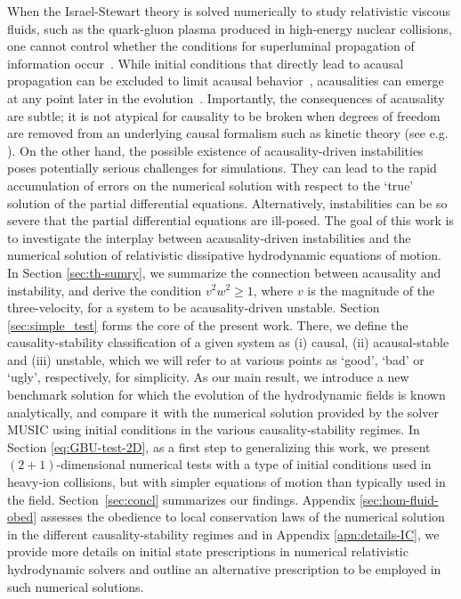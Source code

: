 \documentclass[aps, prd, showkeys,superscriptaddress, nofootinbib,floatfix]{revtex4-2}
\begin{document}
When the Israel-Stewart theory is solved numerically to study relativistic viscous fluids, such as the quark-gluon plasma produced in high-energy nuclear collisions, one cannot control whether the conditions for superluminal propagation of information occur~\cite{Plumberg:2021bme,Chiu:2021muk,ExTrEMe:2023nhy,Domingues:2024pom}. While initial conditions that directly lead to acausal propagation can be excluded to limit acausal behavior~\cite{Domingues:2024pom}, acausalities can emerge at any point later in the evolution~\cite{Hoshino:2024qun}. Importantly, the consequences of acausality are subtle; it is not atypical for causality to be broken when degrees of freedom are removed from an underlying causal formalism such as kinetic theory (see e.g. \cite{GavassinoDispersions2024}). 
On the other hand, the possible existence of acausality-driven instabilities poses potentially serious challenges for simulations. They can lead to the rapid accumulation of errors on the numerical solution with respect to the `true' solution of the partial differential equations. Alternatively, instabilities can be so severe that the partial differential equations are ill-posed. The goal of this work is to investigate the interplay between acausality-driven instabilities and the numerical solution of relativistic dissipative hydrodynamic equations of motion. In Section \ref{sec:th-sumry}, we summarize the connection between acausality and instability, and derive the condition $v^{2} w^{2} \geq 1$, where $v$ is the magnitude of the three-velocity, for a system to be acausality-driven unstable. Section \ref{sec:simple_test} forms the core of the present work. There, we define the causality-stability classification of a given system as (i) causal, (ii) acausal-stable and (iii) unstable, which we will refer to at various points as `good', `bad' or `ugly', respectively, for simplicity.  As our main result, we introduce a new benchmark solution for which the evolution of the hydrodynamic fields is known analytically, and compare it with the numerical solution provided by the solver MUSIC \cite{Schenke:2010nt,Schenke:2010rr,Paquet:2015lta} using initial conditions in the various causality-stability regimes. In Section \ref{eq:GBU-test-2D}, as a first step to generalizing this work, we present $(2+1)$-dimensional numerical tests with a type of initial conditions used in heavy-ion collisions, but with simpler equations of motion than typically used in the field.
Section~\ref{sec:concl} summarizes our findings. Appendix \ref{sec:hom-fluid-obed} assesses the obedience to local conservation laws of the numerical solution in the different causality-stability regimes and in Appendix \ref{apn:details-IC}, we provide more details on initial state prescriptions in numerical relativistic hydrodynamic solvers and outline an alternative prescription to be employed in such numerical solutions.       
\end{document}
